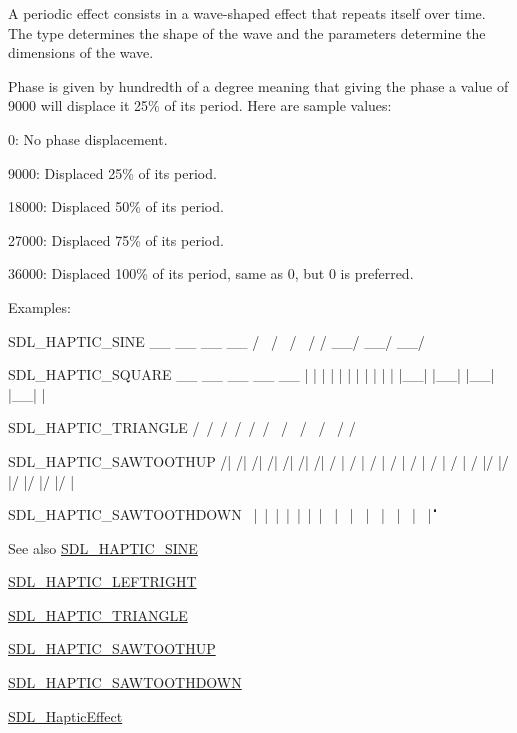 A periodic effect consists in a wave-\/shaped effect that repeats itself over time. The type determines the shape of the wave and the parameters determine the dimensions of the wave.

Phase is given by hundredth of a degree meaning that giving the phase a value of 9000 will displace it 25\% of its period. Here are sample values\+:
\begin{DoxyItemize}
\item 0\+: No phase displacement.
\item 9000\+: Displaced 25\% of its period.
\item 18000\+: Displaced 50\% of its period.
\item 27000\+: Displaced 75\% of its period.
\item 36000\+: Displaced 100\% of its period, same as 0, but 0 is preferred.
\end{DoxyItemize}

Examples\+: \begin{DoxyVerb}SDL_HAPTIC_SINE
  __      __      __      __
 /  \    /  \    /  \    /
/    \__/    \__/    \__/

SDL_HAPTIC_SQUARE
 __    __    __    __    __
|  |  |  |  |  |  |  |  |  |
|  |__|  |__|  |__|  |__|  |

SDL_HAPTIC_TRIANGLE
  /\    /\    /\    /\    /\
 /  \  /  \  /  \  /  \  /
/    \/    \/    \/    \/

SDL_HAPTIC_SAWTOOTHUP
  /|  /|  /|  /|  /|  /|  /|
 / | / | / | / | / | / | / |
/  |/  |/  |/  |/  |/  |/  |

SDL_HAPTIC_SAWTOOTHDOWN
\  |\  |\  |\  |\  |\  |\  |
 \ | \ | \ | \ | \ | \ | \ |
  \|  \|  \|  \|  \|  \|  \|
\end{DoxyVerb}


\begin{DoxySeeAlso}{See also}
\hyperlink{_s_d_l__haptic_8h_aa6d75adbfcdda5075078e7a2849da5c0}{S\+D\+L\+\_\+\+H\+A\+P\+T\+I\+C\+\_\+\+S\+I\+NE} 

\hyperlink{_s_d_l__haptic_8h_ae047624d8458ff6400887c37a36f86d3}{S\+D\+L\+\_\+\+H\+A\+P\+T\+I\+C\+\_\+\+L\+E\+F\+T\+R\+I\+G\+HT} 

\hyperlink{_s_d_l__haptic_8h_ae8123eaa51511507375ba6ef9220fa46}{S\+D\+L\+\_\+\+H\+A\+P\+T\+I\+C\+\_\+\+T\+R\+I\+A\+N\+G\+LE} 

\hyperlink{_s_d_l__haptic_8h_ab8e3f40f3c2bcee8905d13b634363c3f}{S\+D\+L\+\_\+\+H\+A\+P\+T\+I\+C\+\_\+\+S\+A\+W\+T\+O\+O\+T\+H\+UP} 

\hyperlink{_s_d_l__haptic_8h_afd64aa747034a7ccf4b55f6246525701}{S\+D\+L\+\_\+\+H\+A\+P\+T\+I\+C\+\_\+\+S\+A\+W\+T\+O\+O\+T\+H\+D\+O\+WN} 

\hyperlink{union_s_d_l___haptic_effect}{S\+D\+L\+\_\+\+Haptic\+Effect} 
\end{DoxySeeAlso}


